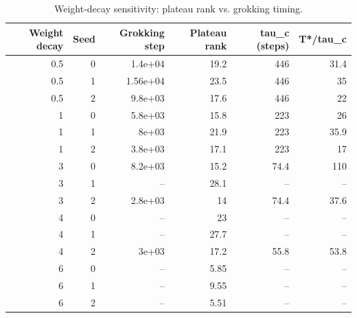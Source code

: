 \begin{table}
\caption{Weight-decay sensitivity: plateau rank vs. grokking timing.}
\label{tab:robustness}
\begin{tabular}{rrrrrr}
\toprule
Weight decay & Seed & Grokking step & Plateau rank & tau\_c (steps) & T*/tau\_c \\
\midrule
0.5 & 0 & 1.4e+04 & 19.2 & 446 & 31.4 \\
0.5 & 1 & 1.56e+04 & 23.5 & 446 & 35 \\
0.5 & 2 & 9.8e+03 & 17.6 & 446 & 22 \\
1 & 0 & 5.8e+03 & 15.8 & 223 & 26 \\
1 & 1 & 8e+03 & 21.9 & 223 & 35.9 \\
1 & 2 & 3.8e+03 & 17.1 & 223 & 17 \\
3 & 0 & 8.2e+03 & 15.2 & 74.4 & 110 \\
3 & 1 & -- & 28.1 & -- & -- \\
3 & 2 & 2.8e+03 & 14 & 74.4 & 37.6 \\
4 & 0 & -- & 23 & -- & -- \\
4 & 1 & -- & 27.7 & -- & -- \\
4 & 2 & 3e+03 & 17.2 & 55.8 & 53.8 \\
6 & 0 & -- & 5.85 & -- & -- \\
6 & 1 & -- & 9.55 & -- & -- \\
6 & 2 & -- & 5.51 & -- & -- \\
\bottomrule
\end{tabular}
\end{table}
